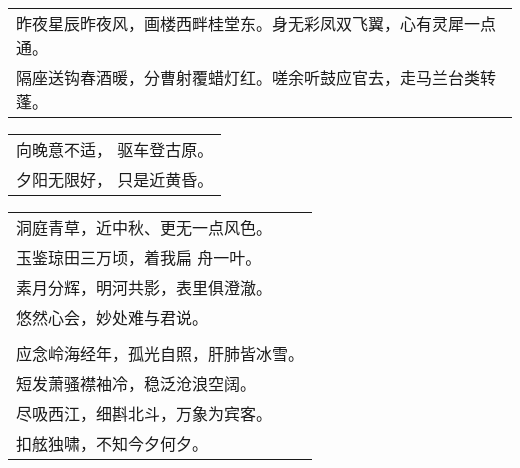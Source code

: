 \nopagebreak%
\nopagebreak%
\noindent\begin{minipage}{\linewidth}
  \vskip-3pt\begin{table}[H]
    \centering
    \begin{tabular}{@{}l@{}}
昨夜星辰昨夜风，画楼西畔桂堂东。身无彩凤双飞翼，心有灵犀一点通。\\
隔座送钩春酒暖，分曹射覆蜡灯红。嗟余听鼓应官去，走马兰台类转蓬。
    \end{tabular}
  \end{table}
\end{minipage}
\vspace{1cm}


\nopagebreak%
\nopagebreak%
\noindent\begin{minipage}{\linewidth}
  \vskip-3pt\begin{table}[H]
    \centering
    \begin{tabular}{@{}l@{}}
向晚意不适， 驱车登古原。\\
夕阳无限好， 只是近黄昏。
    \end{tabular}
  \end{table}
\end{minipage}
\vspace{1cm}


\nopagebreak%
\nopagebreak%
\noindent\begin{minipage}{\linewidth}
  \vskip-3pt\begin{table}[H]
    \centering
    \begin{tabular}{@{}l@{}}
洞庭青草，近中秋、更无一点风色。\\
玉鉴琼田三万顷，着我扁 舟一叶。\\
素月分辉，明河共影，表里俱澄澈。\\
悠然心会，妙处难与君说。\\
\\
应念岭海经年，孤光自照，肝肺皆冰雪。\\
短发萧骚襟袖冷，稳泛沧浪空阔。\\
尽吸西江，细斟北斗，万象为宾客。\\
扣舷独啸，不知今夕何夕。
    \end{tabular}
  \end{table}
\end{minipage}
\vspace{1cm}


